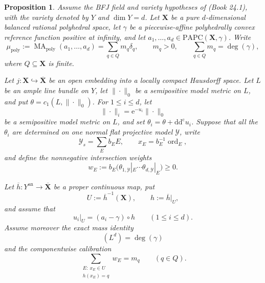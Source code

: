 \documentclass[11pt,a4paper]{article}
\newtheorem{proposition}[proposition]{Proposition}
\theoremstyle{definition}
\theoremstyle{remark}
\newcommand{\rd}{\mathrm d}
\newcommand{\dc}{\rd^{\mathrm c}}
\newcommand{\ddc}{\rd\dc}
\DeclareMathOperator{\ord}{ord}
\DeclareMathOperator{\MA}{MA}
\begin{document}
\begin{proposition}
\label{prop:p055-model-calibration-transfer}
Assume the BFJ field and variety hypotheses of
\textup{(Book 24.1)}, with the variety denoted by $Y$ and
$\dim Y=d$.  Let $\mathbf X$ be a pure $d$-dimensional balanced rational
polyhedral space, let $\gamma$ be a piecewise-affine polyhedrally convex
reference function positive at infinity, and let
$a_1,\ldots,a_d\in\mathrm{PAPC}(\mathbf X,\gamma)$.  Write
\begin{equation}
 \mu_{\mathrm{poly}}
 :=\MA_{\mathrm{poly}}(a_1,\ldots,a_d)
 =\sum_{q\in Q}m_q\delta_q,
 \qquad m_q>0,
 \qquad \sum_{q\in Q}m_q=\deg(\gamma),
 \label{eq:p055-model-polyhedral-atoms}
\end{equation}
where $Q\subseteq\mathbf X$ is finite.

Let $j:\mathbf X\hookrightarrow\overline{\mathbf X}$ be an open embedding
into a locally compact Hausdorff space.  Let $L$ be an ample line bundle on
$Y$, let $\|\cdot\|_0$ be a semipositive model metric on $L$, and put
$\theta=c_1(L,\|\cdot\|_0)$.  For $1\leq i\leq d$, let
\begin{equation}
 \|\cdot\|_i=\mathrm e^{-u_i}\|\cdot\|_0
 \label{eq:p055-model-relative-metrics}
\end{equation}
be a semipositive model metric on $L$, and set
$\theta_i=\theta+\ddc u_i$.  Suppose that all the $\theta_i$ are determined
on one normal flat projective model $\mathcal Y$, write
\[
 \mathcal Y_s=\sum_E b_EE,
 \qquad x_E=b_E^{-1}\ord_E,
\]
and define the nonnegative intersection weights
\begin{equation}
 w_E:=b_E
 \bigl(\theta_{1,\mathcal Y}|_E\cdots
       \theta_{d,\mathcal Y}|_E\bigr)\geq0.
 \label{eq:p055-model-intersection-weights}
\end{equation}

Let $\overline h:Y^{\mathrm{an}}\to\overline{\mathbf X}$ be a proper
continuous map, put
\[
 U:=\overline h^{-1}(\mathbf X),
 \qquad h:=\overline h|_U,
\]
and assume that
\begin{equation}
 u_i|_U=(a_i-\gamma)\circ h
 \qquad(1\leq i\leq d).
 \label{eq:p055-model-lift}
\end{equation}
Assume moreover the exact mass identity
\begin{equation}
 (L^d)=\deg(\gamma)
 \label{eq:p055-model-mass-match}
\end{equation}
and the componentwise calibration
\begin{equation}
 \sum_{\substack{E:\ x_E\in U\\ h(x_E)=q}}w_E=m_q
 \qquad(q\in Q).
 \label{eq:p055-model-component-calibration}
\end{equation}


\end{proposition}
\end{document}
